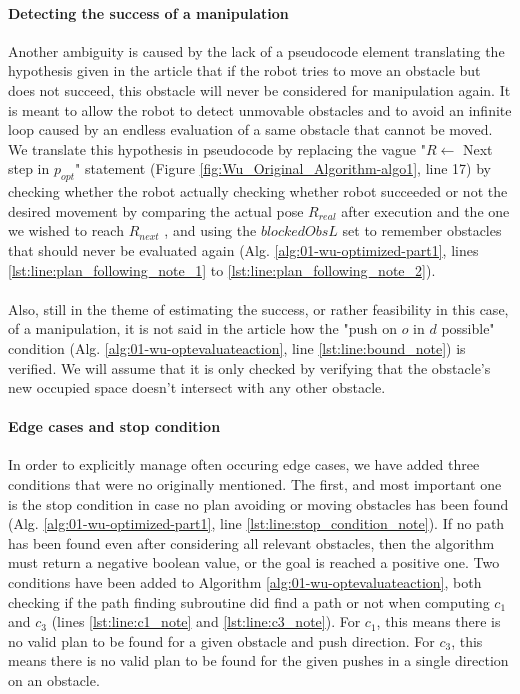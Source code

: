 \paragraph{Detecting the success of a manipulation} Another ambiguity is caused by the lack of a pseudocode element translating the hypothesis given in the article that if the robot tries to move an obstacle but does not succeed, this obstacle will never be considered for manipulation again. It is meant to allow the robot to detect unmovable obstacles and to avoid an infinite loop caused by an endless evaluation of a same obstacle that cannot be moved. We translate this hypothesis in pseudocode by replacing the vague "$R \gets$ Next step in $p_{opt}$" statement (Figure \ref{fig:Wu_Original_Algorithm-algo1}, line 17) by checking whether the robot actually checking whether robot succeeded or not the desired movement by comparing the actual pose $R_{real}$ after execution and the one we wished to reach $R_{next}$ , and using the $blockedObsL$ set to remember obstacles that should never be evaluated again (Alg. \ref{alg:01-wu-optimized-part1}, lines \ref{lst:line:plan_following_note_1} to \ref{lst:line:plan_following_note_2}).

\paragraph{} Also, still in the theme of estimating the success, or rather feasibility in this case, of a manipulation, it is not said in the article how the "push on $o$ in $d$ possible" condition (Alg. \ref{alg:01-wu-optevaluateaction}, line \ref{lst:line:bound_note}) is verified. We will assume that it is only checked by verifying that the obstacle's new occupied space doesn't intersect with any other obstacle.

\paragraph{Edge cases and stop condition} In order to explicitly manage often occuring edge cases, we have added three conditions that were no originally mentioned. The first, and most important one is the stop condition in case no plan avoiding or moving obstacles has been found (Alg. \ref{alg:01-wu-optimized-part1}, line \ref{lst:line:stop_condition_note}). If no path has been found even after considering all relevant obstacles, then the algorithm must return a negative boolean value, or the goal is reached a positive one. Two conditions have been added to Algorithm \ref{alg:01-wu-optevaluateaction}, both checking if the path finding subroutine did find a path or not when computing $c_{1}$ and $c_{3}$ (lines \ref{lst:line:c1_note} and \ref{lst:line:c3_note}). For $c_{1}$, this means there is no valid plan to be found for a given obstacle and push direction. For $c_{3}$, this means there is no valid plan to be found for the given pushes in a single direction on an obstacle.

